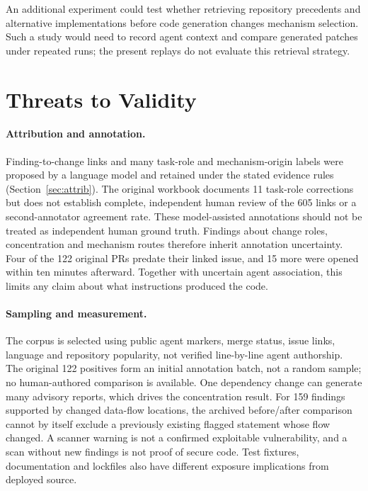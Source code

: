 \documentclass[acmsmall,screen,nonacm]{acmart}
\begin{document}
An additional experiment could test whether retrieving repository precedents and alternative implementations before code generation changes mechanism selection. Such a study would need to record agent context and compare generated patches under repeated runs; the present replays do not evaluate this retrieval strategy.

\section{Threats to Validity}\label{sec:threats}

\paragraph{Attribution and annotation.} Finding-to-change links and many task-role and mechanism-origin labels were proposed by a language model and retained under the stated evidence rules (Section~\ref{sec:attrib}). The original workbook documents 11 task-role corrections but does not establish complete, independent human review of the 605 links or a second-annotator agreement rate. These model-assisted annotations should not be treated as independent human ground truth. Findings about change roles, concentration and mechanism routes therefore inherit annotation uncertainty. Four of the 122 original PRs predate their linked issue, and 15 more were opened within ten minutes afterward. Together with uncertain agent association, this limits any claim about what instructions produced the code.

\paragraph{Sampling and measurement.} The corpus is selected using public agent markers, merge status, issue links, language and repository popularity, not verified line-by-line agent authorship. The original 122 positives form an initial annotation batch, not a random sample; no human-authored comparison is available. One dependency change can generate many advisory reports, which drives the concentration result. For 159 findings supported by changed data-flow locations, the archived before/after comparison cannot by itself exclude a previously existing flagged statement whose flow changed. A scanner warning is not a confirmed exploitable vulnerability, and a scan without new findings is not proof of secure code. Test fixtures, documentation and lockfiles also have different exposure implications from deployed source.
\end{document}
